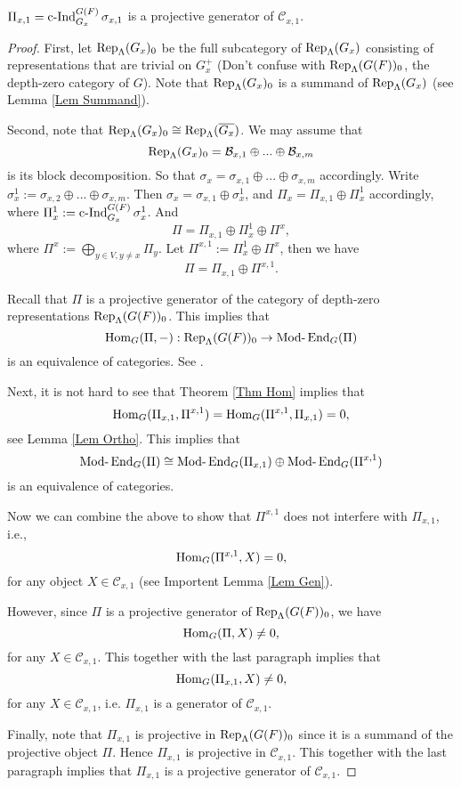 		\begin{theorem}
			$\Pi_{x,1}=\operatorname{\operatorname{c-Ind}}_{G_x}^{G(F)}\sigma_{x,1}$ is a projective generator of $\mathcal{C}_{x,1}$.
		\end{theorem}
		
		\begin{proof}
			First, let $\operatorname{\operatorname{Rep}}_{\Lambda}(G_x)_0$ be the full subcategory of $\operatorname{\operatorname{Rep}}_{\Lambda}(G_x)$ consisting of representations that are trivial on $G_x^+$ (Don't confuse with $\operatorname{\operatorname{Rep}}_{\Lambda}(G(F))_0$, the depth-zero category of $G$). Note that $\operatorname{\operatorname{Rep}}_{\Lambda}(G_x)_0$ is a summand of $\operatorname{\operatorname{Rep}}_{\Lambda}(G_x)$ (see Lemma \ref{Lem Summand}).
			
			Second, note that $\operatorname{\operatorname{Rep}}_{\Lambda}(G_x)_0 \cong \operatorname{\operatorname{Rep}}_{\Lambda}(\overline{G_x})$. We may assume that $$\operatorname{\operatorname{Rep}}_{\Lambda}(G_x)_0=\mathcal{B}_{x,1} \oplus ... \oplus \mathcal{B}_{x,m}$$
			is its block decomposition. So that $\sigma_x=\sigma_{x,1}\oplus...\oplus\sigma_{x,m}$ accordingly. Write $\sigma_x^1:=\sigma_{x,2}\oplus...\oplus\sigma_{x,m}$. Then $\sigma_x=\sigma_{x,1} \oplus \sigma_x^1$, and $\Pi_x=\Pi_{x,1} \oplus \Pi_x^1$ accordingly, where $\Pi_x^1:=\operatorname{\operatorname{c-Ind}}_{G_x}^{G(F)}\sigma_x^1$. And
			$$\Pi=\Pi_{x,1}\oplus \Pi_x^1 \oplus \Pi^x,$$
			where $\Pi^x:=\bigoplus_{y \in V, y \neq x}\Pi_y$. Let $\Pi^{x,1}:=\Pi_x^1 \oplus \Pi^x$, then we have
			$$\Pi=\Pi_{x,1} \oplus \Pi^{x,1}.$$
			
			Recall that $\Pi$ is a projective generator of the category of depth-zero representations $\operatorname{\operatorname{Rep}}_{\Lambda}(G(F))_0$. This implies that 
			$$\operatorname{\operatorname{Hom}}_G(\Pi, -): \operatorname{\operatorname{Rep}}_{\Lambda}(G(F))_0 \to \operatorname{Mod-}\operatorname{\operatorname{End}}_G(\Pi)$$
			is an equivalence of categories. See \cite[Lemma 22]{bernsteindraft}.
			
			Next, it is not hard to see that Theorem \ref{Thm Hom} implies that 
			$$\operatorname{\operatorname{Hom}}_G(\Pi_{x,1}, \Pi^{x,1})=\operatorname{\operatorname{Hom}}_G(\Pi^{x,1}, \Pi_{x,1})=0,$$
			see Lemma \ref{Lem Ortho}. This implies that $$\operatorname{Mod-}\operatorname{\operatorname{End}}_G(\Pi) \cong \operatorname{Mod-}\operatorname{\operatorname{End}}_G(\Pi_{x,1}) \oplus \operatorname{Mod-}\operatorname{\operatorname{End}}_G(\Pi^{x,1})$$ is an equivalence of categories.
			
			Now we can combine the above to show that $\Pi^{x,1}$ does not interfere with $\Pi_{x,1}$, i.e.,
			$$\operatorname{\operatorname{Hom}}_G(\Pi^{x,1}, X)=0,$$
			for any object $X \in \mathcal{C}_{x,1}$ (see Importent Lemma \ref{Lem Gen}).
			
			However, since $\Pi$ is a projective generator of $\operatorname{\operatorname{Rep}}_{\Lambda}(G(F))_0$, we have
			$$\operatorname{\operatorname{Hom}}_G(\Pi, X) \neq 0,$$
			for any $X \in \mathcal{C}_{x,1}$. This together with the last paragraph implies that 
			$$\operatorname{\operatorname{Hom}}_G(\Pi_{x,1}, X) \neq 0,$$
			for any $X \in \mathcal{C}_{x,1}$, i.e. $\Pi_{x,1}$ is a generator of $\mathcal{C}_{x,1}$.
			
			Finally, note that $\Pi_{x,1}$ is projective in $\operatorname{\operatorname{Rep}}_{\Lambda}(G(F))_0$ since it is a summand of the projective object $\Pi$. Hence $\Pi_{x,1}$ is projective in $\mathcal{C}_{x,1}$. This together with the last paragraph implies that $\Pi_{x,1}$ is a projective generator of $\mathcal{C}_{x,1}$.
			
			
		\end{proof}
		
